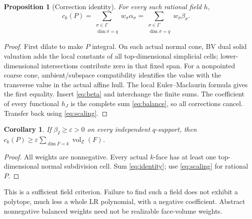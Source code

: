 \documentclass[11pt]{article}
\newtheorem{proposition}[theorem]{Proposition}
\newtheorem{corollary}[theorem]{Corollary}
\theoremstyle{definition}\newtheorem{definition}[theorem]{Definition}
\theoremstyle{remark}\newtheorem{remark}[theorem]{Remark}
\newcommand{\Z}{\mathbb Z}\newcommand{\Q}{\mathbb Q}\newcommand{\R}{\mathbb R}
\newcommand{\vol}{\operatorname{vol}_{\Z}}
\newcommand{\eps}{\varepsilon}
\begin{document}
\begin{proposition}[Correction identity]\label{prop:identity}
For every such rational field \(h\),
\begin{equation}\label{eq:identity}
 c_k(P)=\sum_{\substack{\sigma\in\Gamma\\\dim\sigma=q}}w_\sigma\alpha_\sigma
       =\sum_{\substack{\sigma\in\Gamma\\\dim\sigma=q}}w_\sigma\beta_\sigma.
\end{equation}
\end{proposition}
\begin{proof}
First dilate to make \(P\) integral. On each actual normal cone, BV dual
solid valuation adds the local constants of all top-dimensional simplicial
cells; lower-dimensional intersections contribute zero in that fixed span.
For a nonpointed coarse cone, ambient/subspace compatibility identifies the
value with the transverse value in the actual affine hull. The local
Euler--Maclaurin formula gives the first equality. Insert
\eqref{eq:beta} and interchange the finite sums. The coefficient of every
functional \(h_J\) is the complete sum \eqref{eq:balance}, so all
corrections cancel. Transfer back using \eqref{eq:scaling}.
\end{proof}

\begin{corollary}\label{cor:all-support}
If \(\beta_I\geq\eps>0\) on every independent \(q\)-support, then
\(c_k(P)\geq\eps\sum_{\dim F=k}\vol(F)\).
\end{corollary}
\begin{proof}
All weights are nonnegative. Every actual \(k\)-face has at least one
top-dimensional normal subdivision cell. Sum \eqref{eq:identity}; use
\eqref{eq:scaling} for rational \(P\).
\end{proof}
This is a sufficient field criterion. Failure to find such a field does
not exhibit a polytope, much less a whole LR polynomial, with a negative
coefficient. Abstract nonnegative balanced weights need not be realizable
face-volume weights.
\end{document}
